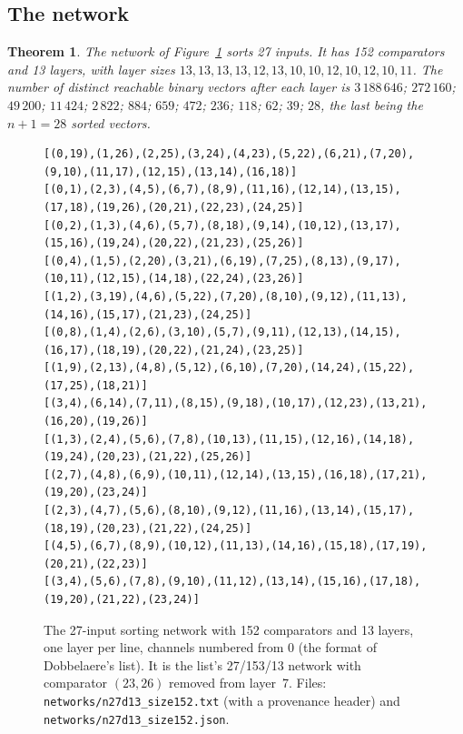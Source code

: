 \documentclass[11pt,a4paper]{article}
\theoremstyle{plain}
\newtheorem{theorem}{Theorem}
\theoremstyle{definition}
\theoremstyle{remark}
\newcommand{\dob}{Dobbelaere's list}
\begin{document}
\subsection{The network}

\begin{theorem}\label{thm:n27}
The network of Figure~\ref{fig:net} sorts 27 inputs. It has 152 comparators and 13 layers, with layer sizes $13,13,13,13,12,13,10,10,12,10,12,10,11$. The number of distinct reachable binary vectors after each layer is
$3\,188\,646$; $272\,160$; $49\,200$; $11\,424$; $2\,822$; $884$; $659$; $472$; $236$; $118$; $62$; $39$; $28$, the last being the $n+1=28$ sorted vectors.
\end{theorem}

\begin{figure}[ht]
\centering
\begin{minipage}{\textwidth}
\scriptsize
\begin{verbatim}
[(0,19),(1,26),(2,25),(3,24),(4,23),(5,22),(6,21),(7,20),(9,10),(11,17),(12,15),(13,14),(16,18)]
[(0,1),(2,3),(4,5),(6,7),(8,9),(11,16),(12,14),(13,15),(17,18),(19,26),(20,21),(22,23),(24,25)]
[(0,2),(1,3),(4,6),(5,7),(8,18),(9,14),(10,12),(13,17),(15,16),(19,24),(20,22),(21,23),(25,26)]
[(0,4),(1,5),(2,20),(3,21),(6,19),(7,25),(8,13),(9,17),(10,11),(12,15),(14,18),(22,24),(23,26)]
[(1,2),(3,19),(4,6),(5,22),(7,20),(8,10),(9,12),(11,13),(14,16),(15,17),(21,23),(24,25)]
[(0,8),(1,4),(2,6),(3,10),(5,7),(9,11),(12,13),(14,15),(16,17),(18,19),(20,22),(21,24),(23,25)]
[(1,9),(2,13),(4,8),(5,12),(6,10),(7,20),(14,24),(15,22),(17,25),(18,21)]
[(3,4),(6,14),(7,11),(8,15),(9,18),(10,17),(12,23),(13,21),(16,20),(19,26)]
[(1,3),(2,4),(5,6),(7,8),(10,13),(11,15),(12,16),(14,18),(19,24),(20,23),(21,22),(25,26)]
[(2,7),(4,8),(6,9),(10,11),(12,14),(13,15),(16,18),(17,21),(19,20),(23,24)]
[(2,3),(4,7),(5,6),(8,10),(9,12),(11,16),(13,14),(15,17),(18,19),(20,23),(21,22),(24,25)]
[(4,5),(6,7),(8,9),(10,12),(11,13),(14,16),(15,18),(17,19),(20,21),(22,23)]
[(3,4),(5,6),(7,8),(9,10),(11,12),(13,14),(15,16),(17,18),(19,20),(21,22),(23,24)]
\end{verbatim}
\end{minipage}
\caption{The 27-input sorting network with 152 comparators and 13 layers, one layer per line, channels numbered from 0 (the format of \dob). It is the list's 27/153/13 network with comparator $(23,26)$ removed from layer~7. Files: \texttt{networks/n27d13\_size152.txt} (with a provenance header) and \texttt{networks/n27d13\_size152.json}.}
\label{fig:net}
\end{figure}
\end{document}
